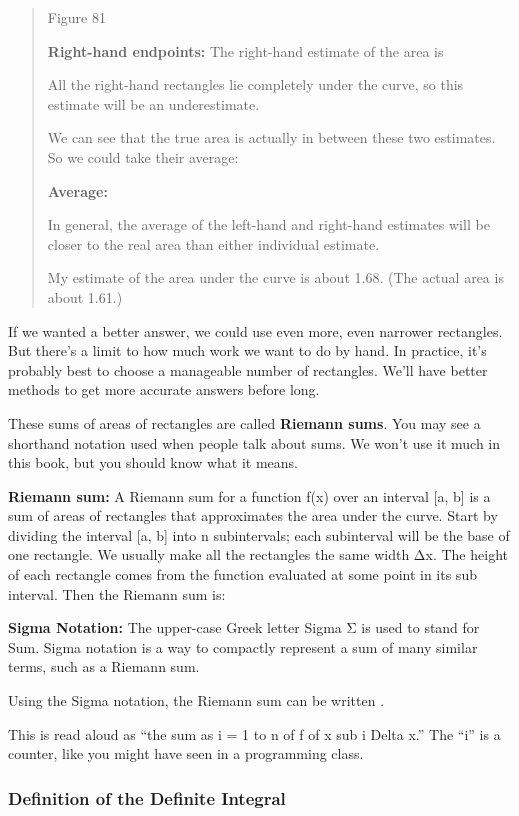 \begin{quote}
Figure 81

\textbf{Right-hand endpoints:} The right-hand estimate of the area is

All the right-hand rectangles lie completely under the curve, so this
estimate will be an underestimate.

We can see that the true area is actually in between these two
estimates. So we could take their average:

\textbf{Average: }

In general, the average of the left-hand and right-hand estimates will
be closer to the real area than either individual estimate.

My estimate of the area under the curve is about 1.68. (The actual area
is about 1.61.)
\end{quote}

If we wanted a better answer, we could use even more, even narrower
rectangles. But there's a limit to how much work we want to do by hand.
In practice, it's probably best to choose a manageable number of
rectangles. We'll have better methods to get more accurate answers
before long.

These sums of areas of rectangles are called \textbf{Riemann sums}. You
may see a shorthand notation used when people talk about sums. We won't
use it much in this book, but you should know what it means.

\textbf{Riemann sum:} A Riemann sum for a function f(x) over an interval
{[}a, b{]} is a sum of areas of rectangles that approximates the area
under the curve. Start by dividing the interval {[}a, b{]} into n
subintervals; each subinterval will be the base of one rectangle. We
usually make all the rectangles the same width Δx. The height of each
rectangle comes from the function evaluated at some point in its sub
interval. Then the Riemann sum is:

\textbf{Sigma Notation:} The upper-case Greek letter Sigma Σ is used to
stand for Sum. Sigma notation is a way to compactly represent a sum of
many similar terms, such as a Riemann sum.

Using the Sigma notation, the Riemann sum can be written .

This is read aloud as ``the sum as i = 1 to n of f of x sub i Delta x.''
The ``i'' is a counter, like you might have seen in a programming class.

\subsubsection{Definition of the Definite
Integral}\label{definition-of-the-definite-integral}

